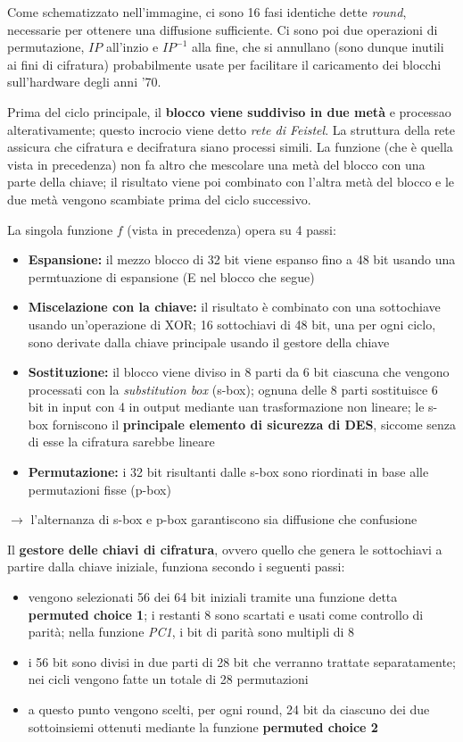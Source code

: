\noindent Come schematizzato nell'immagine, ci sono 16 fasi identiche dette \textit{round}, necessarie per ottenere una diffusione sufficiente. Ci sono poi due 
operazioni di permutazione, $IP$ all'inzio e $IP^{-1}$ alla fine, che si annullano (sono dunque inutili ai fini di cifratura) probabilmente 
usate per facilitare il caricamento dei blocchi sull'hardware degli anni '70.

\noindent Prima del ciclo principale, il \textbf{blocco viene suddiviso in due metà} e processao alterativamente; questo incrocio viene detto 
\textit{rete di Feistel}. La struttura della rete assicura che cifratura e decifratura siano processi simili.  La funzione (che è quella vista 
in precedenza) non fa altro che mescolare una metà del blocco con una parte della chiave; il risultato viene poi combinato con l'altra metà 
del blocco e le due metà vengono scambiate prima del ciclo successivo.

\noindent La singola funzione $f$ (vista in precedenza) opera su 4 passi:
\begin{itemize}
    \item \textbf{Espansione:} il mezzo blocco di 32 bit viene espanso fino a 48 bit usando una permtuazione di espansione (E nel blocco che segue)
    \item \textbf{Miscelazione con la chiave:} il risultato è combinato con una sottochiave usando un'operazione di XOR; 16 sottochiavi di 48 bit, una 
    per ogni ciclo, sono derivate dalla chiave principale usando il gestore della chiave 
    \item \textbf{Sostituzione:} il blocco viene diviso in 8 parti da 6 bit ciascuna che vengono processati con la \textit{substitution box} (s-box); ognuna delle 8 parti 
    sostituisce 6 bit in input con 4 in output mediante uan trasformazione non lineare; le s-box forniscono il \textbf{principale elemento di sicurezza di DES}, siccome 
    senza di esse la cifratura sarebbe lineare
    \item \textbf{Permutazione:} i 32 bit risultanti dalle s-box sono riordinati in base alle permutazioni fisse (p-box)
\end{itemize}

$\rightarrow$ l'alternanza di s-box e p-box garantiscono sia diffusione che confusione 

\noindent Il \textbf{gestore delle chiavi di cifratura}, ovvero quello che genera le sottochiavi a partire dalla chiave iniziale, funziona 
secondo i seguenti passi:
\begin{itemize}
    \item vengono selezionati 56 dei 64 bit iniziali tramite una funzione detta \textbf{permuted choice 1}; i restanti 8 sono scartati e usati 
    come controllo di parità; nella funzione \textit{PC1}, i bit di parità sono multipli di 8 
    \item i 56 bit sono divisi in due parti di 28 bit che verranno trattate separatamente; nei cicli vengono fatte un totale di 28 permutazioni 
    \item a questo punto vengono scelti, per ogni round, 24 bit da ciascuno dei due sottoinsiemi ottenuti mediante la funzione \textbf{permuted choice 2}
\end{itemize}

